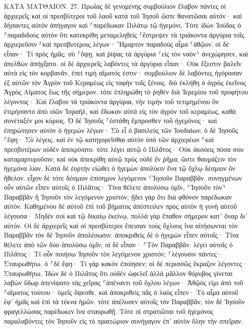 \documentclass[twoside, 9pt]{extreport}
\begin{document}
ΚΑΤΑ ΜΑΤΘΑΙΟΝ.
27.
Πρωΐας δὲ γενομένης συμβούλιον ἔλαβον πάντες οἱ ἀρχιερεῖς καὶ οἱ πρεσβύτεροι τοῦ λαοῦ κατὰ τοῦ Ἰησοῦ ὥστε θανατῶσαι αὐτόν· 
καὶ δήσαντες αὐτὸν ἀπήγαγον καὶ ⸀παρέδωκαν Πιλάτῳ τῷ ἡγεμόνι. 
Τότε ἰδὼν Ἰούδας ὁ ⸀παραδιδοὺς αὐτὸν ὅτι κατεκρίθη μεταμεληθεὶς ⸀ἔστρεψεν τὰ τριάκοντα ἀργύρια τοῖς ἀρχιερεῦσιν ⸀καὶ πρεσβυτέροις 
λέγων· Ἥμαρτον παραδοὺς αἷμα ⸀ἀθῷον. οἱ δὲ εἶπαν· Τί πρὸς ἡμᾶς; σὺ ⸀ὄψῃ. 
καὶ ῥίψας τὰ ἀργύρια ⸂εἰς τὸν ναὸν⸃ ἀνεχώρησεν, καὶ ἀπελθὼν ἀπήγξατο. 
οἱ δὲ ἀρχιερεῖς λαβόντες τὰ ἀργύρια εἶπαν· Οὐκ ἔξεστιν βαλεῖν αὐτὰ εἰς τὸν κορβανᾶν, ἐπεὶ τιμὴ αἵματός ἐστιν· 
συμβούλιον δὲ λαβόντες ἠγόρασαν ἐξ αὐτῶν τὸν Ἀγρὸν τοῦ Κεραμέως εἰς ταφὴν τοῖς ξένοις. 
διὸ ἐκλήθη ὁ ἀγρὸς ἐκεῖνος Ἀγρὸς Αἵματος ἕως τῆς σήμερον. 
τότε ἐπληρώθη τὸ ῥηθὲν διὰ Ἰερεμίου τοῦ προφήτου λέγοντος· Καὶ ἔλαβον τὰ τριάκοντα ἀργύρια, τὴν τιμὴν τοῦ τετιμημένου ὃν ἐτιμήσαντο ἀπὸ υἱῶν Ἰσραήλ, 
καὶ ἔδωκαν αὐτὰ εἰς τὸν ἀγρὸν τοῦ κεραμέως, καθὰ συνέταξέν μοι κύριος. 
Ὁ δὲ Ἰησοῦς ⸀ἐστάθη ἔμπροσθεν τοῦ ἡγεμόνος· καὶ ἐπηρώτησεν αὐτὸν ὁ ἡγεμὼν λέγων· Σὺ εἶ ὁ βασιλεὺς τῶν Ἰουδαίων; ὁ δὲ Ἰησοῦς ⸀ἔφη· Σὺ λέγεις. 
καὶ ἐν τῷ κατηγορεῖσθαι αὐτὸν ὑπὸ τῶν ἀρχιερέων ⸀καὶ πρεσβυτέρων οὐδὲν ἀπεκρίνατο. 
τότε λέγει αὐτῷ ὁ Πιλᾶτος· Οὐκ ἀκούεις πόσα σου καταμαρτυροῦσιν; 
καὶ οὐκ ἀπεκρίθη αὐτῷ πρὸς οὐδὲ ἓν ῥῆμα, ὥστε θαυμάζειν τὸν ἡγεμόνα λίαν. 
Κατὰ δὲ ἑορτὴν εἰώθει ὁ ἡγεμὼν ἀπολύειν ἕνα τῷ ὄχλῳ δέσμιον ὃν ἤθελον. 
εἶχον δὲ τότε δέσμιον ἐπίσημον λεγόμενον ⸀Ἰησοῦν Βαραββᾶν. 
συνηγμένων οὖν αὐτῶν εἶπεν αὐτοῖς ὁ Πιλᾶτος· Τίνα θέλετε ἀπολύσω ὑμῖν, ⸂Ἰησοῦν τὸν⸃ Βαραββᾶν ἢ Ἰησοῦν τὸν λεγόμενον χριστόν; 
ᾔδει γὰρ ὅτι διὰ φθόνον παρέδωκαν αὐτόν. 
Καθημένου δὲ αὐτοῦ ἐπὶ τοῦ βήματος ἀπέστειλεν πρὸς αὐτὸν ἡ γυνὴ αὐτοῦ λέγουσα· Μηδὲν σοὶ καὶ τῷ δικαίῳ ἐκείνῳ, πολλὰ γὰρ ἔπαθον σήμερον κατ᾽ ὄναρ δι᾽ αὐτόν. 
Οἱ δὲ ἀρχιερεῖς καὶ οἱ πρεσβύτεροι ἔπεισαν τοὺς ὄχλους ἵνα αἰτήσωνται τὸν Βαραββᾶν τὸν δὲ Ἰησοῦν ἀπολέσωσιν. 
ἀποκριθεὶς δὲ ὁ ἡγεμὼν εἶπεν αὐτοῖς· Τίνα θέλετε ἀπὸ τῶν δύο ἀπολύσω ὑμῖν; οἱ δὲ εἶπαν· ⸀Τὸν Βαραββᾶν. 
λέγει αὐτοῖς ὁ Πιλᾶτος· Τί οὖν ποιήσω Ἰησοῦν τὸν λεγόμενον χριστόν; ⸀λέγουσιν πάντες· Σταυρωθήτω. 
ὁ ⸀δὲ ἔφη· Τί γὰρ κακὸν ἐποίησεν; οἱ δὲ περισσῶς ἔκραζον λέγοντες· Σταυρωθήτω. 
Ἰδὼν δὲ ὁ Πιλᾶτος ὅτι οὐδὲν ὠφελεῖ ἀλλὰ μᾶλλον θόρυβος γίνεται λαβὼν ὕδωρ ἀπενίψατο τὰς χεῖρας ⸀ἀπέναντι τοῦ ὄχλου λέγων· Ἀθῷός εἰμι ἀπὸ τοῦ ⸀αἵματος τούτου· ὑμεῖς ὄψεσθε. 
καὶ ἀποκριθεὶς πᾶς ὁ λαὸς εἶπεν· Τὸ αἷμα αὐτοῦ ἐφ᾽ ἡμᾶς καὶ ἐπὶ τὰ τέκνα ἡμῶν. 
τότε ἀπέλυσεν αὐτοῖς τὸν Βαραββᾶν, τὸν δὲ Ἰησοῦν φραγελλώσας παρέδωκεν ἵνα σταυρωθῇ. 
Τότε οἱ στρατιῶται τοῦ ἡγεμόνος παραλαβόντες τὸν Ἰησοῦν εἰς τὸ πραιτώριον συνήγαγον ἐπ᾽ αὐτὸν ὅλην τὴν σπεῖραν. 
\end{document}
